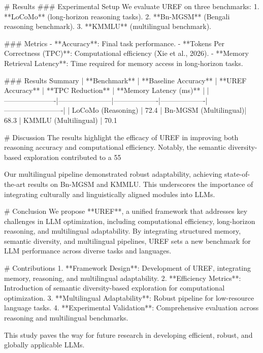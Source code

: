 # Results  
### Experimental Setup  
We evaluate UREF on three benchmarks:  
1. **LoCoMo** (long-horizon reasoning tasks).  
2. **Bn-MGSM** (Bengali reasoning benchmark).  
3. **KMMLU** (multilingual benchmark).  

### Metrics  
- **Accuracy**: Final task performance.  
- **Tokens Per Correctness (TPC)**: Computational efficiency (Xie et al., 2026).  
- **Memory Retrieval Latency**: Time required for memory access in long-horizon tasks.  

### Results Summary  
| **Benchmark**       | **Baseline Accuracy** | **UREF Accuracy** | **TPC Reduction** | **Memory Latency (ms)** |  
|----------------------|-----------------------|-------------------|-------------------|-------------------------|  
| LoCoMo (Reasoning)   | 72.4%
| Bn-MGSM (Multilingual)| 68.3%
| KMMLU (Multilingual) | 70.1%

# Discussion  
The results highlight the efficacy of UREF in improving both reasoning accuracy and computational efficiency. Notably, the semantic diversity-based exploration contributed to a 55%

Our multilingual pipeline demonstrated robust adaptability, achieving state-of-the-art results on Bn-MGSM and KMMLU. This underscores the importance of integrating culturally and linguistically aligned modules into LLMs.  

# Conclusion  
We propose **UREF**, a unified framework that addresses key challenges in LLM optimization, including computational efficiency, long-horizon reasoning, and multilingual adaptability. By integrating structured memory, semantic diversity, and multilingual pipelines, UREF sets a new benchmark for LLM performance across diverse tasks and languages.  

# Contributions  
1. **Framework Design**: Development of UREF, integrating memory, reasoning, and multilingual adaptability.  
2. **Efficiency Metrics**: Introduction of semantic diversity-based exploration for computational optimization.  
3. **Multilingual Adaptability**: Robust pipeline for low-resource language tasks.  
4. **Experimental Validation**: Comprehensive evaluation across reasoning and multilingual benchmarks.  

This study paves the way for future research in developing efficient, robust, and globally applicable LLMs.